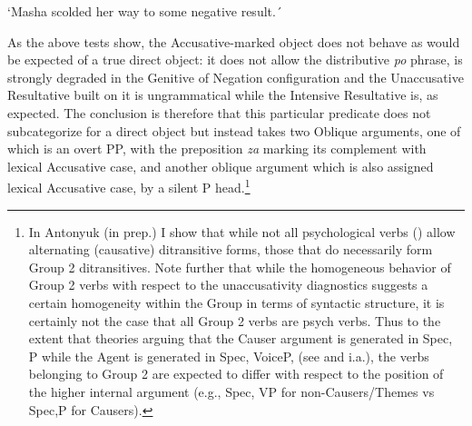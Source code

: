\documentclass[output=paper,colorlinks,citecolor=brown,modfonts,nonflat]{langsci/langscibook}
\begin{document}
\ea%
    \label{ex:antonyuk:55}
    \citep{Tatevosov2010}
    \glt    `Masha scolded her way to some negative result.´
    \z
\z

As the above tests show, the Accusative-marked object does not behave as would be expected of a true direct object: it does not allow the distributive \textit{po} phrase, is strongly degraded in the Genitive of Negation configuration and the Unaccusative Resultative built on it is ungrammatical while the Intensive Resultative is, as expected. The conclusion is therefore that this particular predicate does not subcategorize for a direct object but instead takes two Oblique arguments, one of which is an overt PP, with the preposition \textit{za} marking its complement with lexical Accusative case, and another oblique argument which is also assigned lexical Accusative case, by a silent P head.\footnote{In Antonyuk (in prep.) I show that while not all psychological verbs (\citealt{BellettiRizzi1988}) allow alternating (causative) ditransitive forms, those that do necessarily form Group 2 ditransitives. Note further that while the homogeneous behavior of Group 2 verbs with respect to the unaccusativity diagnostics suggests a certain homogeneity within the Group in terms of syntactic structure, it is certainly not the case that all Group 2 verbs are psych verbs. Thus to the extent that theories arguing that the Causer argument is generated in Spec, \liv P while the Agent is generated in Spec, VoiceP, (see \citealt{Kratzer2005} and \citealt{AlexiadouEtAl2006} i.a.), the verbs belonging to Group 2 are expected to differ with respect to the position of the higher internal argument (e.g., Spec, VP for non-Causers/Themes vs Spec,\liv P for Causers).}
\end{document}
